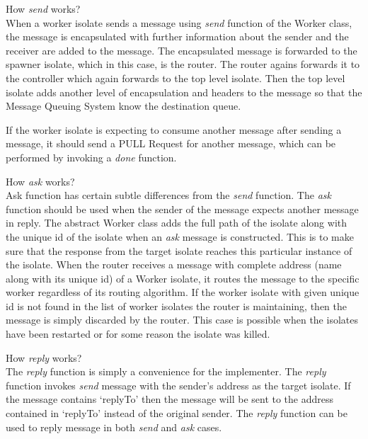   \begin{description}
    \item How \emph{send} works?\\
      When a worker isolate sends a message using \emph{send} function of the Worker class, the message is encapsulated with further information about the sender and the receiver are added to the message. The encapsulated message is forwarded to the spawner isolate, which in this case, is the router. The router agains forwards it to the controller which again forwards to the top level isolate. Then the top level isolate adds another level of encapsulation and headers to the message so that the Message Queuing System know the destination queue.

      If the worker isolate is expecting to consume another message after sending a message, it should send a PULL Request for another message, which can be performed by invoking a \emph{done} function.

      \item \label{itm:askWorking}How \emph{ask} works?\\
    Ask function has certain subtle differences from the \emph{send} function. The \emph{ask} function should be used when the sender of the message expects another message in reply. The abstract Worker class adds the full path of the isolate along with the unique id of the isolate when an \emph{ask} message is constructed. This is to make sure that the response from the target isolate reaches this particular instance of the isolate. When the router receives a message with complete address (name along with its unique id) of a Worker isolate, it routes the message to the specific worker regardless of its routing algorithm. If the worker isolate with given unique id is not found in the list of worker isolates the router is maintaining, then the message is simply discarded by the router. This case is possible when the isolates have been restarted or for some reason the isolate was killed.

    \item How \emph{reply} works?\\
    The \emph{reply} function is simply a convenience for the implementer. The \emph{reply} function invokes \emph{send} message with the sender’s address as the target isolate. If the message contains ‘replyTo’ then the message will be sent to the address contained in ‘replyTo’ instead of the original sender. The \emph{reply} function can be used to reply message in both \textendash{} \emph{send} and \emph{ask} cases.


\end{description}
